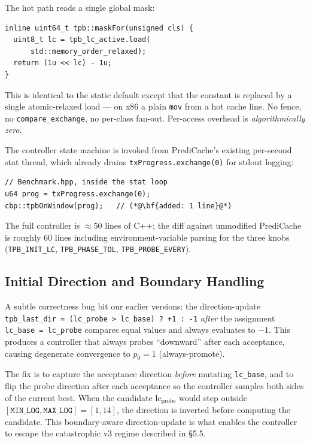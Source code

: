 \documentclass[10pt,twocolumn]{article}
\begin{document}
The hot path reads a single global mask:

\begin{lstlisting}
inline uint64_t tpb::maskFor(unsigned cls) {
  uint8_t lc = tpb_lc_active.load(
      std::memory_order_relaxed);
  return (1u << lc) - 1u;
}
\end{lstlisting}

\noindent
This is identical to the static default except that the constant is
replaced by a single atomic-relaxed load --- on x86 a plain
\texttt{mov} from a hot cache line.  No fence, no
\texttt{compare\_exchange}, no per-class fan-out.  Per-access overhead
is \emph{algorithmically zero}.

The controller state machine is invoked from PrediCache's existing
per-second stat thread, which already drains
\texttt{txProgress.exchange(0)} for stdout logging:

\begin{lstlisting}
// Benchmark.hpp, inside the stat loop
u64 prog = txProgress.exchange(0);
cbp::tpbOnWindow(prog);   // (*@\bf{added: 1 line}@*)
\end{lstlisting}

\noindent
The full controller is $\approx 50$ lines of C++; the diff against
unmodified PrediCache is roughly 60 lines including environment-variable
parsing for the three knobs (\texttt{TPB\_INIT\_LC},
\texttt{TPB\_PHASE\_TOL}, \texttt{TPB\_PROBE\_EVERY}).

\subsection{Initial Direction and Boundary Handling}

A subtle correctness bug bit our earlier versions: the direction-update
\texttt{tpb\_last\_dir = (lc\_probe > lc\_base) ? +1 : -1} \emph{after}
the assignment \texttt{lc\_base = lc\_probe} compares equal values and
always evaluates to $-1$.  This produces a controller that always probes
``downward'' after each acceptance, causing degenerate convergence to
$p_0 = 1$ (always-promote).

The fix is to capture the acceptance direction \emph{before} mutating
\texttt{lc\_base}, and to flip the probe direction after each acceptance
so the controller samples both sides of the current best.  When the
candidate $\text{lc}_{\text{probe}}$ would step outside
$[\texttt{MIN\_LOG}, \texttt{MAX\_LOG}]\!=\![1,14]$, the direction is
inverted before computing the candidate.  This boundary-aware
direction-update is what enables the controller to escape the
catastrophic v3 regime described in \S5.5.
\end{document}
